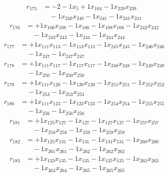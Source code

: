 \[\begin{aligned}
r_{175} &= - 2 - 1 x_{5} + 1 x_{104} - 1 x_{239} x_{239} \\
 &\quad - 1 x_{240} x_{240} - 1 x_{241} - 1 x_{241} x_{241}
\end{aligned}\]
\[\begin{aligned}
r_{176} &= + 1 x_{106} x_{108} - 1 x_{108} - 1 x_{108} x_{108} - 1 x_{242} x_{242} \\
 &\quad - 1 x_{243} x_{243} - 1 x_{244} - 1 x_{244} x_{244}
\end{aligned}\]
\[\begin{aligned}
r_{177} &= + 1 x_{111} x_{113} - 1 x_{113} x_{113} - 1 x_{245} x_{245} - 1 x_{246} x_{246} \\
 &\quad - 1 x_{247} - 1 x_{247} x_{247}
\end{aligned}\]
\[\begin{aligned}
r_{178} &= + 1 x_{111} x_{117} - 1 x_{117} x_{117} - 1 x_{248} x_{248} - 1 x_{249} x_{249} \\
 &\quad - 1 x_{250} - 1 x_{250} x_{250}
\end{aligned}\]
\[\begin{aligned}
r_{179} &= + 1 x_{111} x_{120} - 1 x_{120} x_{120} - 1 x_{251} x_{251} - 1 x_{252} x_{252} \\
 &\quad - 1 x_{253} - 1 x_{253} x_{253}
\end{aligned}\]
\[\begin{aligned}
r_{180} &= + 1 x_{111} x_{123} - 1 x_{123} x_{123} - 1 x_{254} x_{254} - 1 x_{255} x_{255} \\
 &\quad - 1 x_{256} - 1 x_{256} x_{256}
\end{aligned}\]
\[\begin{aligned}
r_{181} &= + 1 x_{125} x_{127} - 1 x_{127} - 1 x_{127} x_{127} - 1 x_{257} x_{257} \\
 &\quad - 1 x_{258} x_{258} - 1 x_{259} - 1 x_{259} x_{259}
\end{aligned}\]
\[\begin{aligned}
r_{182} &= + 1 x_{125} x_{131} - 1 x_{131} - 1 x_{131} x_{131} - 1 x_{260} x_{260} \\
 &\quad - 1 x_{261} x_{261} - 1 x_{262} - 1 x_{262} x_{262}
\end{aligned}\]
\[\begin{aligned}
r_{183} &= + 1 x_{133} x_{135} - 1 x_{135} - 1 x_{135} x_{135} - 1 x_{263} x_{263} \\
 &\quad - 1 x_{264} x_{264} - 1 x_{265} - 1 x_{265} x_{265}
\end{aligned}\]
